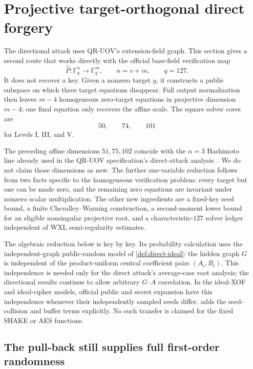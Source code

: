 \documentclass[11pt,a4paper]{article}
\theoremstyle{definition}
\theoremstyle{remark}
\newcommand{\F}{\mathbb F}
\begin{document}
\section{Projective target-orthogonal direct forgery}\label{sec:direct}

The directional attack uses QR-UOV's extension-field graph.  This section gives
a second route that works directly with the official base-field verification
map
\[
 \widehat P:\F_q^n\longrightarrow\F_q^m,
 \qquad n=v+m,
 \qquad q=127.
\]
It does not recover a key.  Given a nonzero target $y$, it constructs a public
subspace on which three target equations disappear.  Full output normalization
then leaves $m-4$ homogeneous zero-target equations in projective dimension
$m-4$; one final equation only recovers the affine scale.  The square solver
cores are
\[
 50,\qquad74,\qquad101
\]
for Levels I, III, and V.

The preceding affine dimensions $51,75,102$ coincide with the $\alpha=3$
Hashimoto line already used in the QR-UOV specification's direct-attack
analysis~\cite{Hashimoto2023,QRUOVSpec}.  We do not claim those dimensions as
new.  The further one-variable reduction follows from two facts specific to
the homogeneous verification problem: every target but one can be made zero,
and the remaining zero equations are invariant under nonzero scalar
multiplication.  The other new ingredients are a fixed-key seed bound, a
finite Chevalley--Warning construction, a second-moment lower bound for an
eligible nonsingular projective root, and a characteristic-$127$ solver ledger
independent of WXL semi-regularity estimates.

The algebraic reduction below is key by key.  Its probability calculation uses
the independent-graph public-random model of \cref{def:direct-ideal}: the
hidden graph $G$ is independent of the product-uniform central coefficient
pairs $(A_i,B_i)$.  This independence is needed only for the direct attack's
average-case root analysis; the directional results continue to allow
arbitrary $G$--$A$ correlation.  In the ideal-XOF and ideal-cipher models,
official public and secret expansion have this independence whenever their
independently sampled seeds differ.   adds the
seed-collision and buffer terms explicitly.  No such transfer is claimed for
the fixed SHAKE or AES functions.

\subsection{The pull-back still supplies full first-order randomness}
\end{document}
